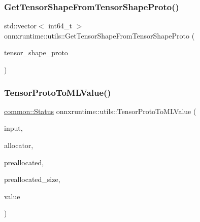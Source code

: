 \subsubsection{\texorpdfstring{Get\+Tensor\+Shape\+From\+Tensor\+Shape\+Proto()}{GetTensorShapeFromTensorShapeProto()}}
{\footnotesize\ttfamily std\+::vector$<$ int64\+\_\+t $>$ onnxruntime\+::utils\+::\+Get\+Tensor\+Shape\+From\+Tensor\+Shape\+Proto (\begin{DoxyParamCaption}\item[{const O\+N\+N\+X\+\_\+\+N\+A\+M\+E\+S\+P\+A\+C\+E\+::\+Tensor\+Shape\+Proto \&}]{tensor\+\_\+shape\+\_\+proto }\end{DoxyParamCaption})}

\mbox{\label{namespaceonnxruntime_1_1utils_af3f247a91aa48e3f4c056314b0c69501}} 
\subsubsection{\texorpdfstring{Tensor\+Proto\+To\+M\+L\+Value()}{TensorProtoToMLValue()}}
{\footnotesize\ttfamily \mbox{\hyperlink{classonnxruntime_1_1common_1_1Status}{common\+::\+Status}} onnxruntime\+::utils\+::\+Tensor\+Proto\+To\+M\+L\+Value (\begin{DoxyParamCaption}\item[{const O\+N\+N\+X\+\_\+\+N\+A\+M\+E\+S\+P\+A\+C\+E\+::\+Tensor\+Proto \&}]{input,  }\item[{\mbox{\hyperlink{namespaceonnxruntime_a6cdac724c5dcefded3a63f08dae58fda}{Allocator\+Ptr}}}]{allocator,  }\item[{\mbox{\hyperlink{mlasi_8h_a88f941d423cb2a819b70a1358982b1a6}{void}} $\ast$}]{preallocated,  }\item[{\mbox{\hyperlink{mlasi_8h_a503efbc1c6e50825320ad909366b78ab}{size\+\_\+t}}}]{preallocated\+\_\+size,  }\item[{\mbox{\hyperlink{classonnxruntime_1_1MLValue}{M\+L\+Value}} \&}]{value }\end{DoxyParamCaption})}

